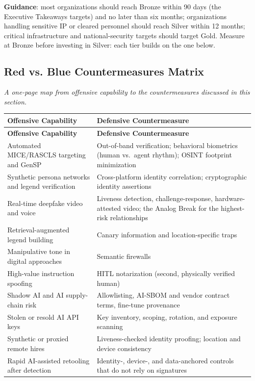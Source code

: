 \documentclass[11pt,letterpaper]{article}
\begin{document}
\textbf{Guidance}: most organizations should reach Bronze within 90 days (the Executive Takeaways targets) and no later than six months; organizations handling sensitive IP or cleared personnel should reach Silver within 12 months; critical infrastructure and national-security targets should target Gold. Measure at Bronze before investing in Silver: each tier builds on the one below.

\subsection{Red vs. Blue Countermeasures Matrix}

\textit{A one-page map from offensive capability to the countermeasures discussed in this section.}

{\small
\begin{longtable}{L{5.2cm}L{7.6cm}}
\toprule
\textbf{Offensive Capability} & \textbf{Defensive Countermeasure} \\
\midrule
\endfirsthead
\toprule
\textbf{Offensive Capability} & \textbf{Defensive Countermeasure} \\
\midrule
\endhead
Automated MICE/RASCLS targeting and GenSP & Out-of-band verification; behavioral biometrics (human vs.\ agent rhythm); OSINT footprint minimization \\*
Synthetic persona networks and legend verification & Cross-platform identity correlation; cryptographic identity assertions \\
Real-time deepfake video and voice & Liveness detection, challenge-response, hardware-attested video; the Analog Break for the highest-risk relationships \\
Retrieval-augmented legend building & Canary information and location-specific traps \\
Manipulative tone in digital approaches & Semantic firewalls \\
High-value instruction spoofing & HITL notarization (second, physically verified human) \\
Shadow AI and AI supply-chain risk & Allowlisting, AI-SBOM and vendor contract terms, fine-tune provenance \\
Stolen or resold AI API keys & Key inventory, scoping, rotation, and exposure scanning \\
Synthetic or proxied remote hires & Liveness-checked identity proofing; location and device consistency \\
Rapid AI-assisted retooling after detection & Identity-, device-, and data-anchored controls that do not rely on signatures \\

\end{longtable}}
\end{document}
